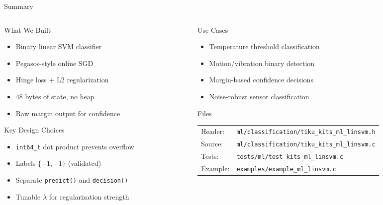 \documentclass[aspectratio=169, 10pt]{beamer}
\begin{document}
\begin{frame}{Summary}
\begin{columns}[T]
\begin{column}{0.48\textwidth}
\begin{block}{What We Built}
\begin{itemize}
  \item Binary linear SVM classifier
  \item Pegasos-style online SGD
  \item Hinge loss + L2 regularization
  \item 48 bytes of state, no heap
  \item Raw margin output for confidence
\end{itemize}
\end{block}

\begin{block}{Key Design Choices}
\begin{itemize}
  \item \texttt{int64\_t} dot product prevents overflow
  \item Labels $\{+1, -1\}$ (validated)
  \item Separate \texttt{predict()} and \texttt{decision()}
  \item Tunable $\lambda$ for regularization strength
\end{itemize}
\end{block}
\end{column}

\begin{column}{0.48\textwidth}
\begin{block}{Use Cases}
\begin{itemize}
  \item Temperature threshold classification
  \item Motion/vibration binary detection
  \item Margin-based confidence decisions
  \item Noise-robust sensor classification
\end{itemize}
\end{block}

\begin{block}{Files}
\scriptsize
\begin{tabular}{@{}lp{4.5cm}@{}}
Header: & \texttt{ml/classification/tiku\_kits\_ml\_linsvm.h} \\
Source: & \texttt{ml/classification/tiku\_kits\_ml\_linsvm.c} \\
Tests: & \texttt{tests/ml/test\_kits\_ml\_linsvm.c} \\
Example: & \texttt{examples/example\_ml\_linsvm.c} \\
\end{tabular}
\end{block}
\end{column}
\end{columns}
\end{frame}
\end{document}
